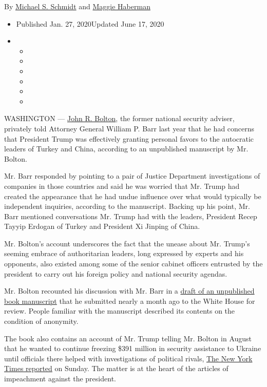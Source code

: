 By
\href{https://www.nytimes3xbfgragh.onion/by/michael-s-schmidt}{Michael
S. Schmidt} and
\href{https://www.nytimes3xbfgragh.onion/by/maggie-haberman}{Maggie
Haberman}

\begin{itemize}
\item
  Published Jan. 27, 2020Updated June 17, 2020
\item
  \begin{itemize}
  \item
  \item
  \item
  \item
  \item
  \item
  \end{itemize}
\end{itemize}

WASHINGTON ---
\href{https://www.nytimes3xbfgragh.onion/2020/06/17/us/politics/bolton-book-trump-impeached.html}{John
R. Bolton}, the former national security adviser, privately told
Attorney General William P. Barr last year that he had concerns that
President Trump was effectively granting personal favors to the
autocratic leaders of Turkey and China, according to an unpublished
manuscript by Mr. Bolton.

Mr. Barr responded by pointing to a pair of Justice Department
investigations of companies in those countries and said he was worried
that Mr. Trump had created the appearance that he had undue influence
over what would typically be independent inquiries, according to the
manuscript. Backing up his point, Mr. Barr mentioned conversations Mr.
Trump had with the leaders, President Recep Tayyip Erdogan of Turkey and
President Xi Jinping of China.

Mr. Bolton's account underscores the fact that the unease about Mr.
Trump's seeming embrace of authoritarian leaders, long expressed by
experts and his opponents, also existed among some of the senior cabinet
officers entrusted by the president to carry out his foreign policy and
national security agendas.

Mr. Bolton recounted his discussion with Mr. Barr in a
\href{https://www.nytimes3xbfgragh.onion/2020/01/26/us/politics/trump-bolton-book-ukraine.html}{draft
of an unpublished book manuscript} that he submitted nearly a month ago
to the White House for review. People familiar with the manuscript
described its contents on the condition of anonymity.

The book also contains an account of Mr. Trump telling Mr. Bolton in
August that he wanted to continue freezing \$391 million in security
assistance to Ukraine until officials there helped with investigations
of political rivals,
\href{https://www.nytimes3xbfgragh.onion/2020/01/26/us/politics/trump-bolton-book-ukraine.html}{The
New York Times reported} on Sunday. The matter is at the heart of the
articles of impeachment against the president.

